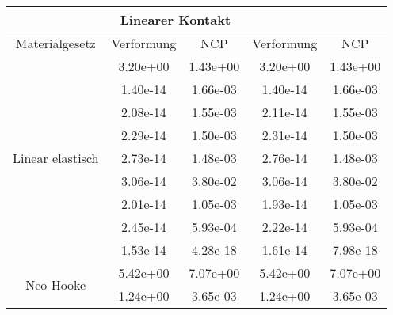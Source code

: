\begin{table} 
\centering 
\begin{tabular}{c|cc|cc|} 
\cline{2-5} 
 & \multicolumn{2}{|c|}{Linearer Kontakt} &  \\ 
\hline 
\multicolumn{1}{|c|}{Materialgesetz} & \multicolumn{1}{c|}{Verformung} & \multicolumn{1}{c|}{NCP} & \multicolumn{1}{c|}{Verformung} & \multicolumn{1}{c|}{NCP} \\ 
\hline 
\multicolumn{1}{|c|}{\multirow{9}{*}{Linear elastisch}} &\multicolumn{1}{|c|}{  3.20e+00} & \multicolumn{1}{|c|}{  1.43e+00} & \multicolumn{1}{|c|}{  3.20e+00} & \multicolumn{1}{|c|}{  1.43e+00} \\ 
\multicolumn{1}{|c|}{} & \multicolumn{1}{|c|}{  1.40e-14} & \multicolumn{1}{|c|}{  1.66e-03} & \multicolumn{1}{|c|}{  1.40e-14} & \multicolumn{1}{|c|}{  1.66e-03} \\ 
\multicolumn{1}{|c|}{} & \multicolumn{1}{|c|}{  2.08e-14} & \multicolumn{1}{|c|}{  1.55e-03} & \multicolumn{1}{|c|}{  2.11e-14} & \multicolumn{1}{|c|}{  1.55e-03} \\ 
\multicolumn{1}{|c|}{} & \multicolumn{1}{|c|}{  2.29e-14} & \multicolumn{1}{|c|}{  1.50e-03} & \multicolumn{1}{|c|}{  2.31e-14} & \multicolumn{1}{|c|}{  1.50e-03} \\ 
\multicolumn{1}{|c|}{} & \multicolumn{1}{|c|}{  2.73e-14} & \multicolumn{1}{|c|}{  1.48e-03} & \multicolumn{1}{|c|}{  2.76e-14} & \multicolumn{1}{|c|}{  1.48e-03} \\ 
\multicolumn{1}{|c|}{} & \multicolumn{1}{|c|}{  3.06e-14} & \multicolumn{1}{|c|}{  3.80e-02} & \multicolumn{1}{|c|}{  3.06e-14} & \multicolumn{1}{|c|}{  3.80e-02} \\ 
\multicolumn{1}{|c|}{} & \multicolumn{1}{|c|}{  2.01e-14} & \multicolumn{1}{|c|}{  1.05e-03} & \multicolumn{1}{|c|}{  1.93e-14} & \multicolumn{1}{|c|}{  1.05e-03} \\ 
\multicolumn{1}{|c|}{} & \multicolumn{1}{|c|}{  2.45e-14} & \multicolumn{1}{|c|}{  5.93e-04} & \multicolumn{1}{|c|}{  2.22e-14} & \multicolumn{1}{|c|}{  5.93e-04} \\ 
\multicolumn{1}{|c|}{} & \multicolumn{1}{|c|}{  1.53e-14} & \multicolumn{1}{|c|}{  4.28e-18} & \multicolumn{1}{|c|}{  1.61e-14} & \multicolumn{1}{|c|}{  7.98e-18} \\ 
\hline 
\multicolumn{1}{|c|}{\multirow{7}{*}{Neo Hooke}} &\multicolumn{1}{|c|}{  5.42e+00} & \multicolumn{1}{|c|}{  7.07e+00} & \multicolumn{1}{|c|}{  5.42e+00} & \multicolumn{1}{|c|}{  7.07e+00} \\ 
\multicolumn{1}{|c|}{} & \multicolumn{1}{|c|}{  1.24e+00} & \multicolumn{1}{|c|}{  3.65e-03} & \multicolumn{1}{|c|}{  1.24e+00} & \multicolumn{1}{|c|}{  3.65e-03} \\ 

\end{tabular}
\end{table}
